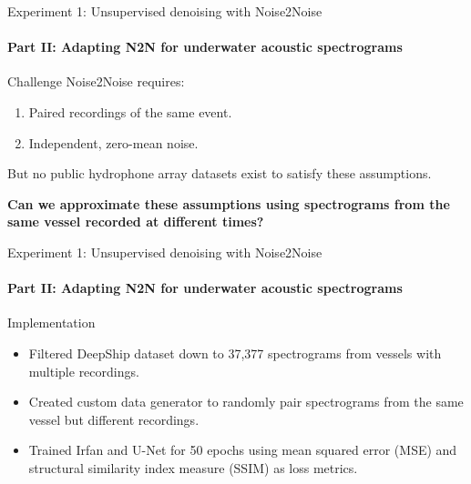 \documentclass[]{beamer}
\begin{document}
\begin{frame}{Experiment 1: Unsupervised denoising with Noise2Noise}
    \framesubtitle{Part II: Adapting N2N for underwater acoustic spectrograms}

    \begin{alertblock}{Challenge}
        Noise2Noise requires:
        \begin{enumerate}
            \item Paired recordings of the same event.
            \item Independent, zero-mean noise.
        \end{enumerate}

    
        But no public hydrophone array datasets exist to satisfy these assumptions.  
    \end{alertblock}

    \vspace{0.5cm}
    
    \textbf{Can we approximate these assumptions using spectrograms from the same vessel recorded at different times?}
\end{frame}

\begin{frame}{Experiment 1: Unsupervised denoising with Noise2Noise}
    \framesubtitle{Part II: Adapting N2N for underwater acoustic spectrograms}

    \begin{block}{Implementation}
    \begin{itemize}
        \item Filtered DeepShip dataset down to 37,377 spectrograms from vessels with multiple recordings.
        \item Created custom data generator to randomly pair spectrograms from the same vessel but different recordings.
        \item Trained Irfan and U-Net for 50 epochs using mean squared error (MSE) and structural similarity index measure (SSIM) as loss metrics.
    \end{itemize}
    \end{block}
\end{frame}
\end{document}
